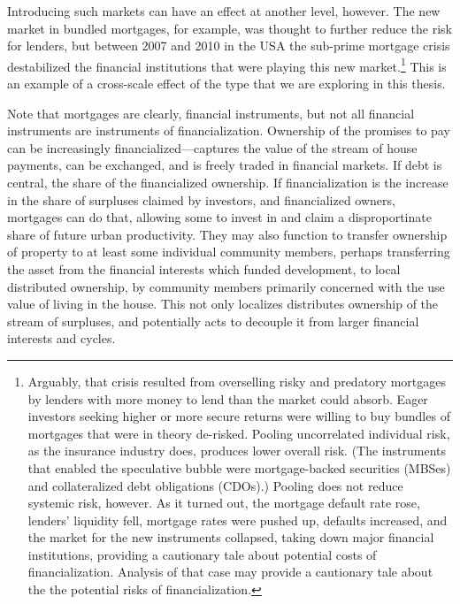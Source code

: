Introducing such  markets can have an effect at another level, however. The new market in bundled mortgages, for example, was thought to further reduce the risk for lenders, but between 2007 and 2010 in the USA the sub-prime mortgage crisis destabilized the financial institutions that were playing this new market.\footnote{Arguably, that crisis resulted from overselling risky and predatory mortgages by lenders with more money to lend than the market could absorb. Eager investors seeking higher or more secure returns were willing  to buy bundles of  mortgages that were in theory de-risked. Pooling uncorrelated individual risk, as the insurance industry does, produces lower overall risk. (The instruments that enabled the speculative bubble were mortgage-backed securities (MBSes) and collateralized debt obligations (CDOs).) Pooling does not reduce systemic risk, however. As it turned out, the mortgage default rate rose, lenders' liquidity fell, mortgage rates were pushed up, defaults increased, and the market for the new instruments collapsed, taking down major financial institutions, providing a cautionary tale about potential costs of financialization. Analysis of that case may provide a cautionary tale about the the potential risks of financialization.} 
This is an example of a cross-scale effect of the type that we are exploring in this thesis.  

Note that mortgages are clearly, financial instruments, but not all financial instruments are instruments of financialization. Ownership of the promises to pay can be increasingly financialized---captures the value of the stream of house payments, can be exchanged, and is freely traded in financial markets. If debt is central, the share of the financialized ownership.
If financialization is the increase in the share of surpluses claimed by investors, and financialized owners, mortgages can do that, allowing some to invest in and claim a disproportinate share of future urban productivity. They may also function to transfer ownership of property to at least some individual community members, perhaps transferring the asset from the financial interests which funded development, to local distributed ownership, by community members primarily concerned with the use value of living in the house. This not only localizes distributes ownership of the stream of surpluses, and potentially acts to decouple it from larger financial interests and cycles. 


